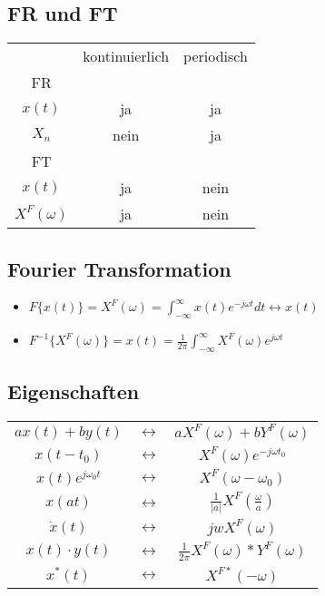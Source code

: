 \documentclass{article}
\begin{document}
\subsection{FR und FT}
\begin{tabular}{ c| c| c }
& kontinuierlich & periodisch \\
FR & & \\ \hline
$x(t)$ & ja & ja \\
 $X_n$ &nein& ja\\
 FT & & \\ \hline
 $x(t)$ & ja & nein \\
 $X^F(\omega)$ & ja & nein \\
\end{tabular}

\subsection{Fourier Transformation}
\begin{itemize}
\item $F\{x(t)\} = X^F(\omega) = \int_{-\infty}^\infty x(t) e^{-j\omega t} dt \leftrightarrow x(t)$
\item $F^{-1}\{X^F(\omega)\} = x(t) = \frac{1}{2\pi}\int_{-\infty}^\infty X^F(\omega) e^{j\omega t}$
\end{itemize}

\subsection{Eigenschaften}
\begin{tabular}{c c c}
$ax(t)+by(t)$ & $\leftrightarrow$ & $aX^F(\omega)+bY^F(\omega)$\\
$x(t-t_0)$ & $\leftrightarrow$ & $X^F(\omega)e^{-j\omega t_0}$\\
$x(t)e^{j\omega_0t}$ & $\leftrightarrow$ & $X^F(\omega-\omega_0)$\\
$x(at)$ & $\leftrightarrow$ & $\frac{1}{|a|}X^F(\frac{\omega}{a})$\\
$\dot{x}(t)$ & $\leftrightarrow$ & $ jw X^F(\omega)$\\
$x(t)\cdot y(t)$ & $\leftrightarrow$ & $\frac{1}{2\pi}X^F(\omega)*Y^F(\omega)$\\
$x^*(t)$ & $\leftrightarrow$ & $X^{F*}(-\omega)$\\
\end{tabular}
\end{document}
